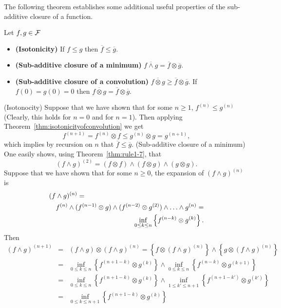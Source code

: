 The following theorem establishes some additional useful properties of the sub-additive closure of a function.
\begin{theorem}
Let $f,g \in \mathcal F$
\begin{itemize}
\item{\textbf{(Isotonicity)} If $f \leq g$ then $\overline{f} \leq \overline{g}$.}
\item{\textbf{(Sub-additive closure of a minimum)} $\overline{f \wedge g} = \overline{f} \otimes \overline{g}$.}
\item{\textbf{(Sub-additive closure of a convolution)} $\overline{f \otimes g} \geq \overline{f} \otimes \overline{g}$.
If $f(0) = g(0) =0$ then  $\overline{f \otimes g} = \overline{f} \otimes \overline{g}$.}
\end{itemize}
\end{theorem}
\pr (Isotonocity) Suppose that we have shown that  for some $n \geq 1$,  $f^{(n)} \leq g^{(n)}$
(Clearly, this holds for $n = 0$ and for $n =1$). Then applying Theorem~\ref{thm:isotonicityofconvolution}
we get
$$ f^{(n+1)} = f^{(n)} \otimes f \leq  g^{(n)} \otimes g = g^{(n+1)}, $$
which implies by recursion on $n$ that $\overline{f} \leq \overline{g}$.
\vspace{1ex}
\noindent
(Sub-additive closure of a minimum) One easily shows, using Theorem~\ref{thm:rule1-7},
that
$$(f \wedge g)^{(2)} = (f \otimes f) \wedge (f \otimes g) \wedge (g \otimes g).$$
Suppose that we have shown that for some $n \geq 0$, the expansion
of $ (f \wedge g)^{(n)}$ is
\begin{eqnarray*}
 \lefteqn{(f \wedge g)^{(n)} = } \\
 & & f^{(n)} \wedge (f^{(n-1)} \otimes g) \wedge (f^{(n-2)} \otimes
g^{(2)}) \wedge \ldots \wedge g^{(n)} =
\\ & & \inf_{0 \leq k \leq n} \left\{ f^{(n-k)} \otimes  g^{(k)}
\right\}.
    \end{eqnarray*}
Then
\begin{eqnarray*}
(f \wedge g)^{(n+1)}  & = & (f \wedge g) \otimes (f \wedge g)^{(n)} = \left\{ f \otimes (f \wedge g)^{(n)} \right\} \wedge
                \left\{ g \otimes (f \wedge g)^{(n)} \right\} \\
            & = & \inf_{0 \leq k \leq n} \left\{ f^{(n+1-k)} \otimes  g^{(k)} \right\} \wedge
            \inf_{0 \leq k \leq n} \left\{ f^{(n-k)} \otimes  g^{(k+1)} \right\} \\
            & = & \inf_{0 \leq k \leq n} \left\{ f^{(n+1-k)} \otimes  g^{(k)} \right\} \wedge
            \inf_{1 \leq k' \leq n+1} \left\{ f^{(n+1-k')} \otimes  g^{(k')} \right\} \\
            & = &   \inf_{0 \leq k \leq n+1} \left\{ f^{(n+1-k)} \otimes  g^{(k)} \right\}
\end{eqnarray*}
